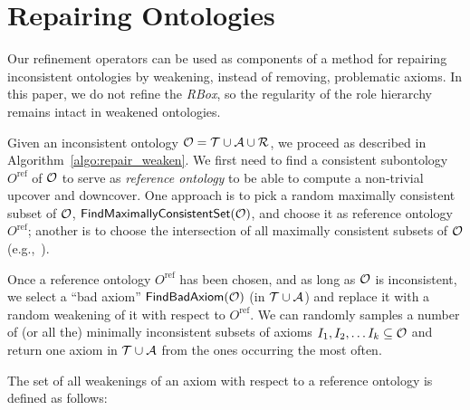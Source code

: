 \documentclass[
]{ceurart}
\newtheorem{definition}{Definition}
\begin{document}
\section{Repairing Ontologies}
\label{sec:repair}
%
Our refinement operators can be used as components of a method for repairing inconsistent \SROIQ ontologies by weakening, instead of removing, problematic axioms. 
%
In this paper, we do not refine the \emph{RBox}, so the regularity of the role hierarchy remains intact in weakened ontologies.%

Given an inconsistent ontology $\mathcal{O} = \mathcal{T} \cup \mathcal{A} \cup \mathcal{R}$, we proceed as described in Algorithm~\ref{algo:repair_weaken}.
%
We first need to find a consistent subontology $O^\text{ref}$ of $\mathcal{O}$ to serve as \emph{reference ontology} %
to be able to compute a non-trivial upcover and downcover. One approach is to pick a random maximally consistent subset of $\mathcal{O}$, $\textsf{FindMaximallyConsistentSet}(\mathcal{O})$, and choose it as reference ontology $O^\text{ref}$; another is to choose the intersection of all maximally consistent subsets of $\mathcal{O}$ (e.g.,~\cite{LLRRS10}).

Once a reference ontology $O^\text{ref}$ has been chosen, and as long as $\mathcal{O}$ is inconsistent, we select a ``bad axiom'' $\textsf{FindBadAxiom}(\mathcal{O})$ (in $\mathcal{T} \cup \mathcal{A}$) and replace it with a random weakening of it with respect to $O^\text{ref}$.
%
%
We can randomly samples a number of (or all the) minimally inconsistent subsets of axioms $I_1, I_2, \ldots I_k \subseteq \mathcal{O}$ and return one axiom in $\mathcal{T} \cup \mathcal{A}$ from the ones occurring the most often.%
%
%

The set of all weakenings of an axiom with respect to a reference ontology is defined as follows:
\end{document}
